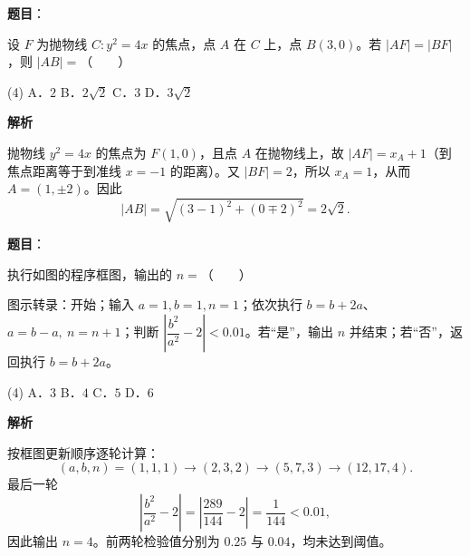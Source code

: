\begin{answer}

\textbf{题目}：

设 $F$ 为抛物线 $C:y^2=4x$ 的焦点，点 $A$ 在 $C$ 上，点 $B(3,0)$。若 $\lvert AF\rvert=\lvert BF\rvert$，则 $\lvert AB\rvert=$\mbox{（　　）}

\begin{gkopts}(4)
\task A．$2$
\task B．$2\sqrt2$
\task C．$3$
\task D．$3\sqrt2$
\end{gkopts}

\textbf{解析}

抛物线 $y^2=4x$ 的焦点为 $F(1,0)$，且点 $A$ 在抛物线上，故 $\lvert AF\rvert=x_A+1$（到焦点距离等于到准线 $x=-1$ 的距离）。又 $\lvert BF\rvert=2$，所以 $x_A=1$，从而 $A=(1,\pm2)$。因此
\nopagebreak[4]
\[
\lvert AB\rvert=\sqrt{(3-1)^2+(0\mp2)^2}=2\sqrt2.
\]


\end{answer}
\begin{answer}

\textbf{题目}：

执行如图的程序框图，输出的 $n=$\mbox{（　　）}

图示转录：开始；输入 $a=1,b=1,n=1$；依次执行 $b=b+2a$、$a=b-a,\ n=n+1$；判断 $\left|\dfrac{b^2}{a^2}-2\right|<0.01$。若“是”，输出 $n$ 并结束；若“否”，返回执行 $b=b+2a$。
\nopagebreak[4]
\begin{center}\end{center}
\nopagebreak[4]
\begin{gkopts}(4)
\task A．$3$
\task B．$4$
\task C．$5$
\task D．$6$
\end{gkopts}

\textbf{解析}

按框图更新顺序逐轮计算：
\nopagebreak[4]
\[
(a,b,n)=(1,1,1)\to(2,3,2)\to(5,7,3)\to(12,17,4).
\]
最后一轮
\nopagebreak[4]
\[
\left|\frac{b^2}{a^2}-2\right|
=\left|\frac{289}{144}-2\right|
=\frac1{144}<0.01,
\]
因此输出 $n=4$。前两轮检验值分别为 $0.25$ 与 $0.04$，均未达到阈值。


\end{answer}
